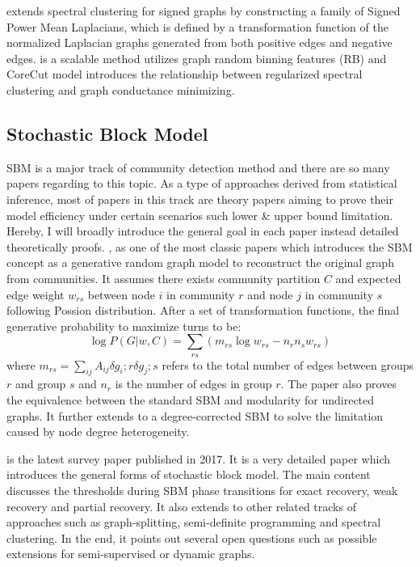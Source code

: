 \cite{mercado2019spectral} extends spectral clustering for signed graphs by constructing a family of Signed Power Mean Laplacians, which is defined by a transformation function of the normalized Laplacian graphs generated from both positive edges and negative edges. \cite{wu2018scalable} is a scalable method utilizes graph random binning features (RB) and CoreCut model \cite{zhang2018understanding} introduces the relationship between regularized spectral clustering and graph conductance minimizing. 


\subsection{Stochastic Block Model}

SBM is a major track of community detection method and there are so many papers regarding to this topic. As a type of approaches derived from statistical inference, most of papers in this track are theory papers aiming to prove their model efficiency under certain scenarios such lower \& upper bound limitation. Hereby, I will broadly introduce the general goal in each paper instead detailed theoretically proofs. \cite{karrer2011stochastic}, as one of the most classic papers which introduces the SBM concept as a generative random graph model to reconstruct the original graph from communities. It assumes there exists community partition $C$ and expected edge weight $w_{rs}$ between node $i$ in community $r$ and node $j$ in community $s$ following Possion distribution. After a set of transformation functions, the final generative probability to maximize turns to be:
\begin{equation}
\log P(G|w,C) = \sum_{rs} (m_{rs}\log w_{rs}-n_rn_sw_{rs})
\end{equation}
where $m_{rs} = \sum_{ij}A_{ij}\delta{g_i;r}\delta{g_j;s}$ refers to the total number of edges between groups $r$ and group $s$ and $n_{r}$ is the number of edges in group $r$. 
The paper also proves the equivalence between the standard SBM and modularity for undirected graphs. It further extends to a degree-corrected SBM  to solve the limitation caused by node degree heterogeneity. 

\cite{abbe2017community} is the latest survey paper published in 2017. It is a very detailed paper which introduces the general forms of stochastic block model. The main content discusses the thresholds during SBM phase transitions for exact recovery, weak recovery and partial recovery. It also extends to other related tracks of approaches such as graph-splitting, semi-definite programming and spectral clustering. In the end, it points out several open questions such as possible extensions for semi-supervised or dynamic graphs. 

